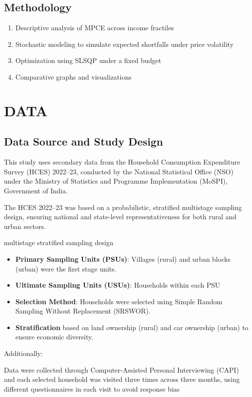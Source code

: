 \documentclass[12pt]{article}
\begin{document}
\subsection{Methodology}
\begin{enumerate}
    \item Descriptive analysis of MPCE across income fractiles
    \item Stochastic modeling to simulate expected shortfalls under price volatility
    \item Optimization using SLSQP under a fixed budget
    \item Comparative graphs and visualizations
\end{enumerate}


\section{DATA}
\subsection{Data Source and Study Design}
This study uses secondary data from the Household Consumption Expenditure Survey (HCES) 2022–23, conducted by the National Statistical Office (NSO) under the Ministry of Statistics and Programme Implementation (MoSPI), Government of India.

The HCES 2022–23 was based on a probabilistic, stratified multistage sampling design, ensuring national and state-level representativeness for both rural and urban sectors.

multistage stratified sampling design
\begin{itemize}
    \item \textbf{Primary Sampling Units (PSUs)}: Villages (rural) and urban blocks (urban) were the first stage units.
    \item \textbf{Ultimate Sampling Units (USUs)}: Households within each PSU
    \item \textbf{Selection Method}: Households were selected using Simple Random Sampling Without Replacement (SRSWOR).
    \item \textbf{Stratification} based on land ownership (rural) and car ownership (urban) to ensure economic diversity.
\end{itemize}

Additionally:

Data were collected through Computer-Assisted Personal Interviewing (CAPI) and each selected household was visited three times across three months, using different questionnaires in each visit to avoid response bias
\end{document}

